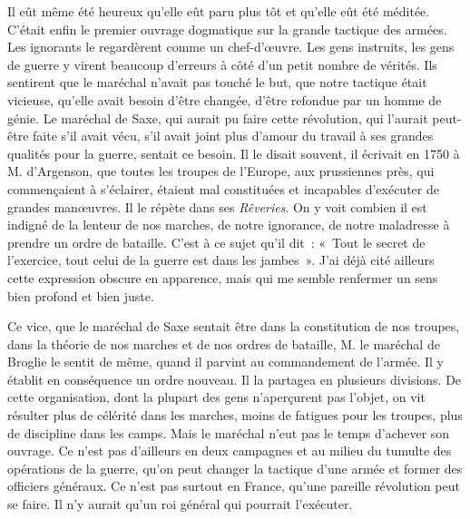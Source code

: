\documentclass[french,twoside]{book} %
\begin{document}
Il eût même été heureux qu’elle eût paru plus tôt et qu’elle eût été méditée. C’était enfin le premier ouvrage dogmatique sur la grande tactique des armées. Les ignorants le regardèrent comme un chef-d’œuvre. Les gens instruits, les gens de guerre y virent beaucoup d’erreurs à côté d’un petit nombre de vérités. Ils sentirent que le maréchal n’avait pas touché le but, que notre tactique était vicieuse, qu’elle avait besoin d’être changée, d’être refondue par un homme de génie. Le maréchal de Saxe, qui aurait pu faire cette révolution, qui l’aurait peut-être faite s’il avait vécu, s’il avait joint plus d’amour du travail à ses grandes qualités pour la guerre, sentait ce besoin. Il le disait souvent, il écrivait en 1750 à M. d’Argenson, que toutes les troupes de l’Europe, aux prussiennes près, qui commençaient à s’éclairer, étaient mal constituées et incapables d’exécuter de grandes manœuvres. Il le répète dans ses {\itshape Rêveries}. On y voit combien il est indigné de la lenteur de nos marches, de notre ignorance, de notre maladresse à prendre un ordre de bataille. C’est à ce sujet qu’il dit : « Tout le secret de l’exercice, tout celui de la guerre est dans les jambes ». J’ai déjà cité ailleurs cette expression obscure en apparence, mais qui me semble renfermer un sens bien profond et bien juste.\par
Ce vice, que le maréchal de Saxe sentait être dans la constitution de nos troupes, dans la théorie de nos marches et de nos ordres de bataille, M. le maréchal de Broglie le sentit de même, quand il parvint au commandement de l’armée. Il y établit en conséquence un ordre nouveau. Il la partagea en plusieurs divisions. De cette organisation, dont la plupart des gens n’aperçurent pas l’objet, on vit résulter plus de célérité dans les marches, moins de fatigues pour les troupes, plus de discipline dans les camps. Mais le maréchal n’eut pas le temps d’achever son ouvrage. Ce n’est pas d’ailleurs en deux campagnes et au milieu du tumulte des opérations de la guerre, qu’on peut changer la tactique d’une armée et former des officiers généraux. Ce n’est pas surtout en France, qu’une pareille révolution peut se faire. Il n’y aurait qu’un roi général qui pourrait l’exécuter.\par
\end{document}
